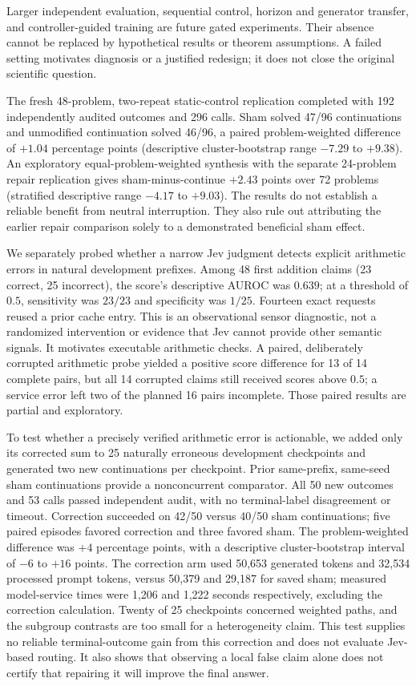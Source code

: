 \documentclass[11pt]{article}
\begin{document}
Larger independent evaluation, sequential control, horizon and generator transfer, and controller-guided training are future gated experiments. Their absence cannot be replaced by hypothetical results or theorem assumptions. A failed setting motivates diagnosis or a justified redesign; it does not close the original scientific question.

The fresh 48-problem, two-repeat static-control replication completed with 192 independently audited outcomes and 296 calls. Sham solved 47/96 continuations and unmodified continuation solved 46/96, a paired problem-weighted difference of $+1.04$ percentage points (descriptive cluster-bootstrap range $-7.29$ to $+9.38$). An exploratory equal-problem-weighted synthesis with the separate 24-problem repair replication gives sham-minus-continue $+2.43$ points over 72 problems (stratified descriptive range $-4.17$ to $+9.03$). The results do not establish a reliable benefit from neutral interruption. They also rule out attributing the earlier repair comparison solely to a demonstrated beneficial sham effect.

We separately probed whether a narrow Jev judgment detects explicit arithmetic errors in natural development prefixes. Among 48 first addition claims (23 correct, 25 incorrect), the score's descriptive AUROC was $0.639$; at a threshold of $0.5$, sensitivity was $23/23$ and specificity was $1/25$. Fourteen exact requests reused a prior cache entry. This is an observational sensor diagnostic, not a randomized intervention or evidence that Jev cannot provide other semantic signals. It motivates executable arithmetic checks. A paired, deliberately corrupted arithmetic probe yielded a positive score difference for 13 of 14 complete pairs, but all 14 corrupted claims still received scores above $0.5$; a service error left two of the planned 16 pairs incomplete. Those paired results are partial and exploratory.

To test whether a precisely verified arithmetic error is actionable, we added only its corrected sum to 25 naturally erroneous development checkpoints and generated two new continuations per checkpoint. Prior same-prefix, same-seed sham continuations provide a nonconcurrent comparator. All 50 new outcomes and 53 calls passed independent audit, with no terminal-label disagreement or timeout. Correction succeeded on 42/50 versus 40/50 sham continuations; five paired episodes favored correction and three favored sham. The problem-weighted difference was $+4$ percentage points, with a descriptive cluster-bootstrap interval of $-6$ to $+16$ points. The correction arm used 50,653 generated tokens and 32,534 processed prompt tokens, versus 50,379 and 29,187 for saved sham; measured model-service times were 1,206 and 1,222 seconds respectively, excluding the correction calculation. Twenty of 25 checkpoints concerned weighted paths, and the subgroup contrasts are too small for a heterogeneity claim. This test supplies no reliable terminal-outcome gain from this correction and does not evaluate Jev-based routing. It also shows that observing a local false claim alone does not certify that repairing it will improve the final answer.
\end{document}
